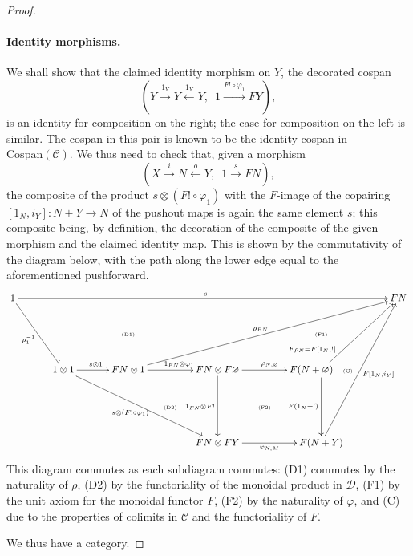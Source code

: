 \begin{proof}
\paragraph{Identity morphisms.} 
We shall show that the claimed identity morphism on $Y$, the decorated cospan
\[
  (Y \stackrel{1_Y}\longrightarrow Y \stackrel{1_Y}\longleftarrow Y,\enspace 1
\stackrel{F!\circ \varphi_1}\longrightarrow FY),
\]
is an identity for composition
on the right; the case for composition on the left is similar. The cospan in
this pair is known to be the identity cospan in $\mathrm{Cospan}(\mathcal C)$.
We thus need to check that, given a morphism 
\[
  (X \stackrel{i}\longrightarrow N
\stackrel{o}\longleftarrow Y,\enspace 1 \stackrel{s}\longrightarrow FN),
\] 
the composite of the product $s \otimes (F! \circ \varphi_1)$ with the $F$-image
of the copairing $[1_N,i_Y]\colon  N+Y \to N$ of the pushout maps is again the same
element $s$; this composite being, by definition, the decoration of the
composite of the given morphism and the claimed identity map. This is shown by
the commutativity of the diagram below, with the path along the lower edge equal
to the aforementioned pushforward.
\[
  \xymatrixcolsep{1.1pc}
  \xymatrix{
    1 \ar[rrrrrrrrrr]^s \ar[ddrr]_{\rho_1^{-1}} &&&&&&&&&& FN \\
    &&&& \textrm{\tiny(D1)} &&&& \textrm{\tiny(F1)}\\
    && 1 \otimes 1 \ar[rr]^{s\otimes 1} \ar[ddrrrr]_{s \otimes (F! \circ
    \varphi_1)} && FN \otimes 1 \ar[uurrrrrr]^{\rho_{FN}} \ar[rr]^(.57){1_{FN}
  \otimes \varphi_1}
    && FN \otimes F\varnothing \ar[rr]^{\varphi_{N,\varnothing}} \ar[dd]_{1_{FN}
  \otimes F!} && F(N+\varnothing) \ar[uurr]^(.2){F\rho_N=F[1_N,!]}
      \ar[dd]_{F(1_N+!)} \quad \textrm{\tiny(C)}\\
      &&&&& \textrm{\tiny(D2)} && \textrm{\tiny(F2)}\\
      &&&&&& FN \otimes FY \ar[rr]_{\varphi_{N,M}} && F(N+Y)
      \ar[uuuurr]_{F[1_N,i_Y]}
  }
\]
This diagram commutes as each subdiagram commutes: (D1) commutes by the
naturality of $\rho$, (D2) by the functoriality of the monoidal product in
$\mathcal D$, (F1) by the unit axiom for the monoidal functor $F$, (F2) by the
naturality of $\varphi$, and (C) due to the properties of colimits in $\mathcal
C$ and the functoriality of $F$.

We thus have a category.
\end{proof}

